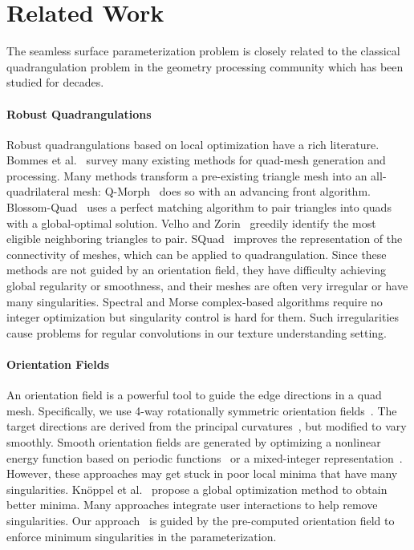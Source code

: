 \section{Related Work}
\label{related:param}
The seamless surface parameterization problem is closely related to the classical quadrangulation problem in the geometry processing community which has been studied for decades.

\paragraph*{Robust Quadrangulations}
Robust quadrangulations based on local optimization have a rich literature. Bommes et al.~\cite{bommes2013quad} survey many existing methods for quad-mesh generation and processing.  Many methods transform a pre-existing triangle mesh into an all-quadrilateral mesh: Q-Morph~\cite{owen1999q} does so with an advancing front algorithm.  Blossom-Quad~\cite{remacle2012blossom} uses a perfect matching algorithm to pair triangles into quads with a global-optimal solution. Velho and Zorin~\cite{velho20014} greedily identify the most eligible neighboring triangles to pair. SQuad~\cite{gurung2011squad} improves the representation of the connectivity of meshes, which can be applied to quadrangulation.  Since these methods are not guided by an orientation field, they have difficulty achieving global regularity or smoothness, and their meshes are often very irregular or have many singularities.  Spectral and Morse complex-based algorithms \cite{dong2006spectral,zhang2010wave,ling2014spectral} require no integer optimization but singularity control is hard for them. Such irregularities cause problems for regular convolutions in our texture understanding setting.

\paragraph*{Orientation Fields}
An orientation field is a powerful tool to guide the edge directions in a quad mesh. Specifically, we use 4-way rotationally symmetric orientation fields~\cite{ray2008n,lai2010metric}. The target directions are derived from the principal curvatures~\cite{cohen2003restricted,cazals2005estimating}, but modified to vary smoothly. Smooth orientation fields are generated by optimizing a nonlinear energy function based on periodic functions~\cite{hertzmann2000illustrating,ray2009geometry} or a mixed-integer representation~\cite{ray2008n,bommes2009mixed}. However, these approaches may get stuck in poor local minima that have many singularities. Kn\"{o}ppel et al.~\cite{knoppel2013globally} propose a global optimization method to obtain better minima. Many approaches \cite{ray2008n,ray2009geometry,crane2010trivial,diamanti2014designing,jiang2015frame} integrate user interactions to help remove singularities. Our approach~\cite{huang2018quadriflow} is guided by the pre-computed orientation field to enforce minimum singularities in the parameterization.

